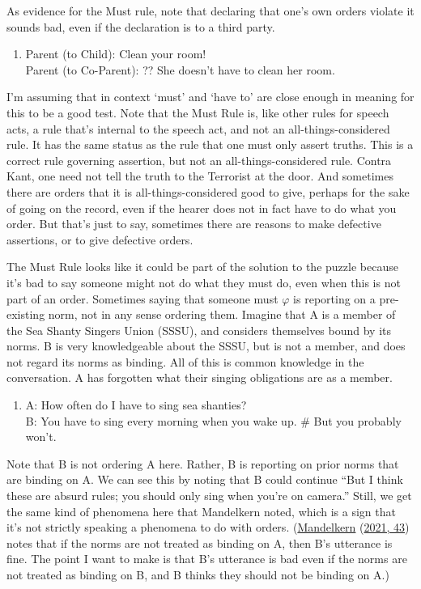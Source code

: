 \documentclass[
  12pt,
]{article}
\providecommand{\tightlist}{%
  \setlength{\itemsep}{0pt}\setlength{\parskip}{0pt}}
\begin{document}
As evidence for the Must rule, note that declaring that one's own orders
violate it sounds bad, even if the declaration is to a third party.

\begin{enumerate}
\def\labelenumi{(\arabic{enumi})}
\setcounter{enumi}{5}
\tightlist
\item
  Parent (to Child): Clean your room!\\
  Parent (to Co-Parent): ?? She doesn't have to clean her room.
\end{enumerate}

I'm assuming that in context `must' and `have to' are close enough in
meaning for this to be a good test. Note that the Must Rule is, like
other rules for speech acts, a rule that's internal to the speech act,
and not an all-things-considered rule. It has the same status as the
rule that one must only assert truths. This is a correct rule governing
assertion, but not an all-things-considered rule. Contra Kant, one need
not tell the truth to the Terrorist at the door. And sometimes there are
orders that it is all-things-considered good to give, perhaps for the
sake of going on the record, even if the hearer does not in fact have to
do what you order. But that's just to say, sometimes there are reasons
to make defective assertions, or to give defective orders.

The Must Rule looks like it could be part of the solution to the puzzle
because it's bad to say someone might not do what they must do, even
when this is not part of an order. Sometimes saying that someone must
\(\varphi\) is reporting on a pre-existing norm, not in any sense
ordering them. Imagine that A is a member of the Sea Shanty Singers
Union (SSSU), and considers themselves bound by its norms. B is very
knowledgeable about the SSSU, but is not a member, and does not regard
its norms as binding. All of this is common knowledge in the
conversation. A has forgotten what their singing obligations are as a
member.

\begin{enumerate}
\def\labelenumi{(\arabic{enumi})}
\setcounter{enumi}{6}
\tightlist
\item
  A: How often do I have to sing sea shanties?\\
  B: You have to sing every morning when you wake up. \# But you
  probably won't.
\end{enumerate}

Note that B is not ordering A here. Rather, B is reporting on prior
norms that are binding on A. We can see this by noting that B could
continue ``But I think these are absurd rules; you should only sing when
you're on camera.'' Still, we get the same kind of phenomena here that
Mandelkern noted, which is a sign that it's not strictly speaking a
phenomena to do with orders.
(\protect\hyperlink{ref-Mandelkern2021}{Mandelkern}
(\protect\hyperlink{ref-Mandelkern2021}{2021, 43}) notes that if the
norms are not treated as binding on A, then B's utterance is fine. The
point I want to make is that B's utterance is bad even if the norms are
not treated as binding on B, and B thinks they should not be binding on
A.)
\end{document}
